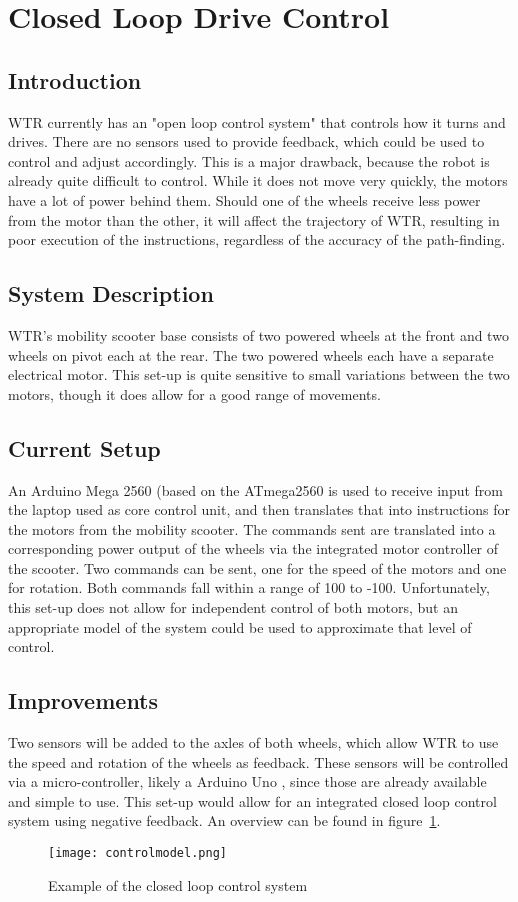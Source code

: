 \section{Closed Loop Drive Control}
\subsection{Introduction}
WTR currently has an "open loop control system" \cite{openloop} that controls how it turns and drives.
There are no sensors used to provide feedback, which could be used to control and adjust accordingly.
This is a major drawback, because the robot is already quite difficult to control.
While it does not move very quickly, the motors have a lot of power behind them.
Should one of the wheels receive less power from the motor than the other, it will affect the trajectory of WTR, resulting in poor execution of the instructions, regardless of the accuracy of the path-finding.

\subsection{System Description}
\label{subs::SysDes}
WTR's mobility scooter base consists of two powered wheels at the front and two wheels on pivot each at the rear.
The two powered wheels each have a separate electrical motor.
This set-up is quite sensitive to small variations between the two motors, though it does allow for a good range of movements.

\subsection{Current Setup}
An Arduino Mega 2560 (based on the ATmega2560 \cite{ardMega} is used to receive input from the laptop used as core control unit, and then translates that into instructions for the motors from the mobility scooter.
The commands sent are translated into a corresponding power output of the wheels via the integrated motor controller of the scooter.
Two commands can be sent, one for the speed of the motors and one for rotation.
Both commands fall within a range of 100 to -100.
Unfortunately, this set-up does not allow for independent control of both motors, but an appropriate model of the system could be used to approximate that level of control.

\subsection{Improvements}
Two sensors will be added to the axles of both wheels, which allow WTR to use the speed and rotation of the wheels as feedback.
These sensors will be controlled via a micro-controller, likely a Arduino Uno \cite{ardUno}, since those are already available and simple to use.
This set-up would allow for an integrated closed loop control system using negative feedback.
An overview can be found in figure~\ref{fig::cllp}.
\begin{figure}[H]
\centering
\texttt{[image: controlmodel.png]}
\caption{Example of the closed loop control system}
\label{fig::cllp}
\end{figure}
\newpage

